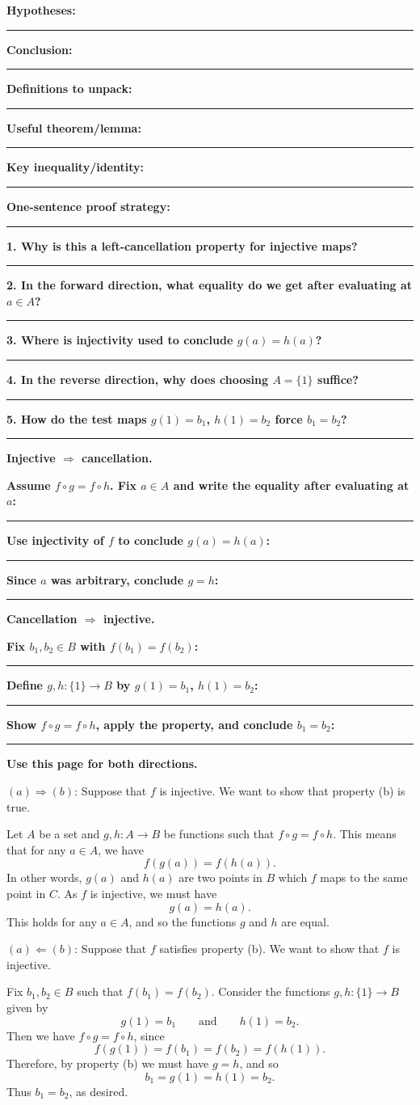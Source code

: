 \documentclass[12pt]{article}
\newcommand{\writespace}[1]{\vspace*{#1}}
\newcommand{\fillfieldbig}[2]{%
  \par\noindent\textbf{#1:}\par
  \writespace{#2}
  \noindent\rule{\linewidth}{0.35pt}\par\vspace{0.15in}%
}
\newcommand{\workquestion}[2]{%
  \par\noindent\textbf{#1}\par
  \writespace{#2}
  \noindent\rule{\linewidth}{0.35pt}\par\vspace{0.18in}%
}
\newcommand{\recipecard}[1]{%
  \begin{tcolorbox}[
    enhanced,
    colback=pass2yellow,
    colframe=yellow!65!black,
    fonttitle=\bfseries,
    title={Pass 2 -- Proof Recipe Card\hfill #1},
    height=8.45in
  ]
  \fillfieldbig{Hypotheses}{0.75in}
  \fillfieldbig{Conclusion}{0.75in}
  \fillfieldbig{Definitions to unpack}{0.95in}
  \fillfieldbig{Useful theorem/lemma}{0.85in}
  \fillfieldbig{Key inequality/identity}{0.8in}
  \fillfieldbig{One-sentence proof strategy}{0.9in}
  \end{tcolorbox}
}
\newenvironment{selfexplanationbox}[1]{%
  \begin{tcolorbox}[
    enhanced,
    colback=pass3orange,
    colframe=orange!65!black,
    fonttitle=\bfseries,
    title={Pass 3 -- Self-Explanation\hfill #1},
    height=8.45in
  ]
}{%
  \end{tcolorbox}
}
\newenvironment{skeletonbox}[1]{%
  \begin{tcolorbox}[
    enhanced,
    breakable,
    colback=pass4purple,
    colframe=purple!55!black,
    fonttitle=\bfseries,
    title={Pass 4 -- Skeleton Proof\hfill #1}
  ]
}{%
  \end{tcolorbox}
}
\newcommand{\fullproofpage}[2]{%
  \begin{tcolorbox}[
    enhanced,
    colback=white,
    colframe=gray!60!black,
    fonttitle=\bfseries,
    title={Pass 5 -- Full Proof Attempt\hfill #1},
    height=8.45in
  ]
  \textbf{#2}

  \writespace{7.65in}
  \end{tcolorbox}
}
\newenvironment{solutionbox}[1]{%
  \begin{tcolorbox}[
    enhanced,
    breakable,
    colback=solgreen,
    colframe=green!45!black,
    fonttitle=\bfseries,
    title={#1}
  ]
}{%
  \end{tcolorbox}
}
\begin{document}
\newpage
\recipecard{Homework 1, Problem 5}

\newpage
\begin{selfexplanationbox}{Homework 1, Problem 5}
\workquestion{1. Why is this a left-cancellation property for injective maps?}{0.95in}
\workquestion{2. In the forward direction, what equality do we get after evaluating at \(a\in A\)?}{0.9in}
\workquestion{3. Where is injectivity used to conclude \(g(a)=h(a)\)?}{0.85in}
\workquestion{4. In the reverse direction, why does choosing \(A=\{1\}\) suffice?}{0.95in}
\workquestion{5. How do the test maps \(g(1)=b_1\), \(h(1)=b_2\) force \(b_1=b_2\)?}{0.95in}
\end{selfexplanationbox}

\newpage
\begin{skeletonbox}{Homework 1, Problem 5}
\textbf{Injective \(\Rightarrow\) cancellation.}
\workquestion{Assume \(f\circ g=f\circ h\). Fix \(a\in A\) and write the equality after evaluating at \(a\):}{0.9in}
\workquestion{Use injectivity of \(f\) to conclude \(g(a)=h(a)\):}{0.85in}
\workquestion{Since \(a\) was arbitrary, conclude \(g=h\):}{0.75in}

\textbf{Cancellation \(\Rightarrow\) injective.}
\workquestion{Fix \(b_1,b_2\in B\) with \(f(b_1)=f(b_2)\):}{0.8in}
\workquestion{Define \(g,h:\{1\}\to B\) by \(g(1)=b_1\), \(h(1)=b_2\):}{0.9in}
\workquestion{Show \(f\circ g=f\circ h\), apply the property, and conclude \(b_1=b_2\):}{0.95in}
\end{skeletonbox}

\newpage
\fullproofpage{Homework 1, Problem 5}{Use this page for both directions.}

\newpage
\begin{solutionbox}{Official Solution (Professor)}
\((a)\Rightarrow(b)\): Suppose that \(f\) is injective. We want to show that property (b) is true.

Let \(A\) be a set and \(g,h:A\to B\) be functions such that \(f\circ g=f\circ h\). This means that for any \(a\in A\), we have
\[
  f(g(a))=f(h(a)).
\]
In other words, \(g(a)\) and \(h(a)\) are two points in \(B\) which \(f\) maps to the same point in \(C\). As \(f\) is injective, we must have
\[
  g(a)=h(a).
\]
This holds for any \(a\in A\), and so the functions \(g\) and \(h\) are equal.

\((a)\Leftarrow(b)\): Suppose that \(f\) satisfies property (b). We want to show that \(f\) is injective.

Fix \(b_1,b_2\in B\) such that \(f(b_1)=f(b_2)\). Consider the functions \(g,h:\{1\}\to B\) given by
\[
  g(1)=b_1 \qquad \text{and} \qquad h(1)=b_2.
\]
Then we have \(f\circ g=f\circ h\), since
\[
  f(g(1))=f(b_1)=f(b_2)=f(h(1)).
\]
Therefore, by property (b) we must have \(g=h\), and so
\[
  b_1=g(1)=h(1)=b_2.
\]
Thus \(b_1=b_2\), as desired.
\end{solutionbox}
\end{document}
